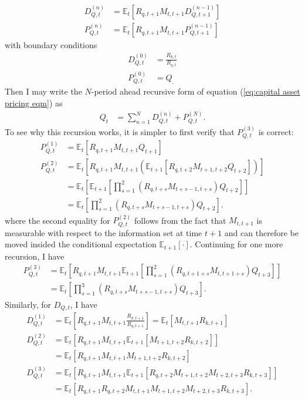 \documentclass[12 pt, oneside]{article}
\theoremstyle{definition}
\theoremstyle{definition}
\theoremstyle{definition}
\newcommand{\E}{\mathbb{E}}
\begin{document}
\begin{align*}
  D_{Q, t}^{(n)} & = \E_t\left[R_{q, t + 1}M_{t, t + 1}D_{Q, t + 1}^{(n - 1)}\right]\\
  P_{Q, t}^{(n)} & = \E_t\left[R_{q, t + 1}M_{t, t + 1} P_{Q, t + 1}^{(n - 1)}\right]
\end{align*}
with boundary conditions
\begin{align*}
  D_{Q, t}^{(0)} & = \frac{R_{k, t}}{R_{q, t}}\\
  P_{Q, t}^{(0)} & = Q_.
\end{align*}
Then I may write the $N$-period ahead recursive form of equation (\ref{eq:capital asset pricing eqm}) as
\begin{align*}
  Q_t & = \sum_{n = 1}^ND_{Q, t}^{(n)} + P_{Q, t}^{(N)}.
\end{align*}
To see why this recursion works, it is simpler to first verify that $P_{Q, t}^{(3)}$ is correct:
\begin{align*}
  P_{Q, t}^{(1)} & = \E_t\left[R_{q, t + 1}M_{t, t + 1} Q_{t + 1}\right]\\
  P_{Q, t}^{(2)} & = \E_t\left[R_{q, t + 1}M_{t, t + 1} (\E_{t + 1}[R_{q, t + 2}M_{t + 1, t + 2} Q_{t + 2}])\right]\\
                 & = \E_t\left[\E_{t + 1}\left[\prod_{s = 1}^2(R_{q, t + s}M_{t + s - 1, t + s}) Q_{t + 2}\right]\right]\\
                 & = \E_t\left[\prod_{s = 1}^2(R_{q, t + s}M_{t + s - 1, t + s}) Q_{t + 2}\right].
\end{align*}
where the second equality for $P_{Q, t}^{(2)}$ follows from the fact that $M_{t, t + 1}$ is measurable with respect to the information set at time $t + 1$ and can
therefore be moved insided the conditional expectation $\E_{t + 1}[\cdot]$. Continuing for one more recursion, I have
\begin{align*}
  P_{Q, t}^{(3)} & = \E_t\left[R_{q, t + 1}M_{t, t + 1}\E_{t + 1}\left[\prod_{s = 1}^2(R_{q, t + 1 + s}M_{t, t + 1 + s}) Q_{t + 3}\right]\right]\\
                 & = \E_t\left[\prod_{s = 1}^3(R_{q, t + s}M_{t + s - 1, t + s}) Q_{t + 3}\right].
\end{align*}
Similarly, for $D_{Q, t}$, I have
\begin{align*}
  D_{Q, t}^{(1)} & = \E_t\left[R_{q, t + 1}M_{t, t + 1}\frac{R_{k, t + 1}}{R_{q, t + 1}}\right] = \E_t[M_{t, t + 1} R_{k, t + 1}]\\
  D_{Q, t}^{(2)} & = \E_t[R_{q, t + 1}M_{t, t + 1}\E_{t + 1}[M_{t + 1, t + 2}R_{k, t + 2}]]\\
                 & = \E_t[R_{q, t + 1}M_{t, t + 1}M_{t + 1, t + 2}R_{k, t + 2}]\\
  D_{Q, t}^{(3)} & = \E_t[R_{q, t + 1}M_{t, t + 1}\E_{t + 1}[R_{q, t + 2}M_{t + 1, t + 2}M_{t + 2, t + 3}R_{k, t + 3}]]\\
                 & = \E_t[R_{q, t + 1}R_{q, t + 2}M_{t, t + 1}M_{t + 1, t + 2}M_{t + 2, t + 3}R_{k, t + 3}].
\end{align*}
\end{document}
